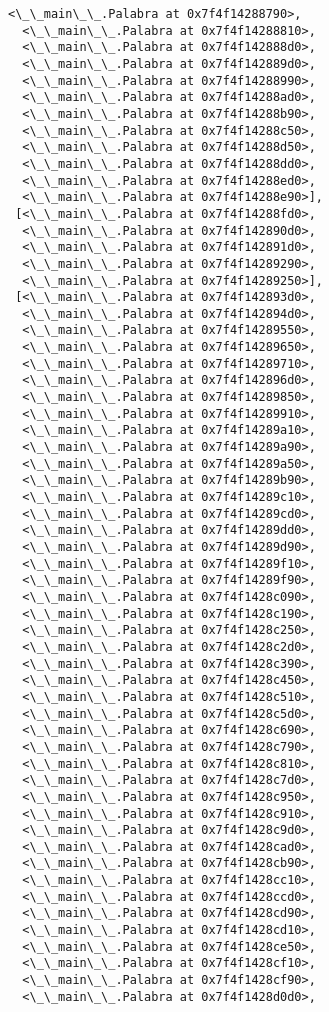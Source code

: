 \documentclass[12pt,a4paper,table]{article}
\begin{document}
\begin{tcolorbox}[breakable, size=fbox, boxrule=.5pt, pad at break*=1mm, opacityfill=0]
\begin{Verbatim}[commandchars=\\\{\}]
  <\_\_main\_\_.Palabra at 0x7f4f14288790>,
  <\_\_main\_\_.Palabra at 0x7f4f14288810>,
  <\_\_main\_\_.Palabra at 0x7f4f142888d0>,
  <\_\_main\_\_.Palabra at 0x7f4f142889d0>,
  <\_\_main\_\_.Palabra at 0x7f4f14288990>,
  <\_\_main\_\_.Palabra at 0x7f4f14288ad0>,
  <\_\_main\_\_.Palabra at 0x7f4f14288b90>,
  <\_\_main\_\_.Palabra at 0x7f4f14288c50>,
  <\_\_main\_\_.Palabra at 0x7f4f14288d50>,
  <\_\_main\_\_.Palabra at 0x7f4f14288dd0>,
  <\_\_main\_\_.Palabra at 0x7f4f14288ed0>,
  <\_\_main\_\_.Palabra at 0x7f4f14288e90>],
 [<\_\_main\_\_.Palabra at 0x7f4f14288fd0>,
  <\_\_main\_\_.Palabra at 0x7f4f142890d0>,
  <\_\_main\_\_.Palabra at 0x7f4f142891d0>,
  <\_\_main\_\_.Palabra at 0x7f4f14289290>,
  <\_\_main\_\_.Palabra at 0x7f4f14289250>],
 [<\_\_main\_\_.Palabra at 0x7f4f142893d0>,
  <\_\_main\_\_.Palabra at 0x7f4f142894d0>,
  <\_\_main\_\_.Palabra at 0x7f4f14289550>,
  <\_\_main\_\_.Palabra at 0x7f4f14289650>,
  <\_\_main\_\_.Palabra at 0x7f4f14289710>,
  <\_\_main\_\_.Palabra at 0x7f4f142896d0>,
  <\_\_main\_\_.Palabra at 0x7f4f14289850>,
  <\_\_main\_\_.Palabra at 0x7f4f14289910>,
  <\_\_main\_\_.Palabra at 0x7f4f14289a10>,
  <\_\_main\_\_.Palabra at 0x7f4f14289a90>,
  <\_\_main\_\_.Palabra at 0x7f4f14289a50>,
  <\_\_main\_\_.Palabra at 0x7f4f14289b90>,
  <\_\_main\_\_.Palabra at 0x7f4f14289c10>,
  <\_\_main\_\_.Palabra at 0x7f4f14289cd0>,
  <\_\_main\_\_.Palabra at 0x7f4f14289dd0>,
  <\_\_main\_\_.Palabra at 0x7f4f14289d90>,
  <\_\_main\_\_.Palabra at 0x7f4f14289f10>,
  <\_\_main\_\_.Palabra at 0x7f4f14289f90>,
  <\_\_main\_\_.Palabra at 0x7f4f1428c090>,
  <\_\_main\_\_.Palabra at 0x7f4f1428c190>,
  <\_\_main\_\_.Palabra at 0x7f4f1428c250>,
  <\_\_main\_\_.Palabra at 0x7f4f1428c2d0>,
  <\_\_main\_\_.Palabra at 0x7f4f1428c390>,
  <\_\_main\_\_.Palabra at 0x7f4f1428c450>,
  <\_\_main\_\_.Palabra at 0x7f4f1428c510>,
  <\_\_main\_\_.Palabra at 0x7f4f1428c5d0>,
  <\_\_main\_\_.Palabra at 0x7f4f1428c690>,
  <\_\_main\_\_.Palabra at 0x7f4f1428c790>,
  <\_\_main\_\_.Palabra at 0x7f4f1428c810>,
  <\_\_main\_\_.Palabra at 0x7f4f1428c7d0>,
  <\_\_main\_\_.Palabra at 0x7f4f1428c950>,
  <\_\_main\_\_.Palabra at 0x7f4f1428c910>,
  <\_\_main\_\_.Palabra at 0x7f4f1428c9d0>,
  <\_\_main\_\_.Palabra at 0x7f4f1428cad0>,
  <\_\_main\_\_.Palabra at 0x7f4f1428cb90>,
  <\_\_main\_\_.Palabra at 0x7f4f1428cc10>,
  <\_\_main\_\_.Palabra at 0x7f4f1428ccd0>,
  <\_\_main\_\_.Palabra at 0x7f4f1428cd90>,
  <\_\_main\_\_.Palabra at 0x7f4f1428cd10>,
  <\_\_main\_\_.Palabra at 0x7f4f1428ce50>,
  <\_\_main\_\_.Palabra at 0x7f4f1428cf10>,
  <\_\_main\_\_.Palabra at 0x7f4f1428cf90>,
  <\_\_main\_\_.Palabra at 0x7f4f1428d0d0>,

\end{Verbatim}
\end{tcolorbox}
\end{document}
